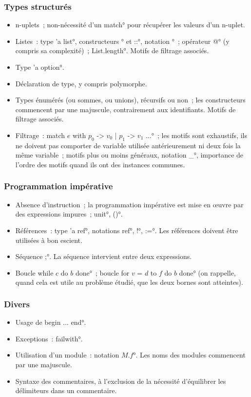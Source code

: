 \subsubsection*{Types structurés}
\begin{itemize}
\item n-uplets~; non-nécessité d'un \°match° pour récupérer les valeurs d'un n-uplet.
\item Listes~: type \°'a list°, constructeurs \°[]° et \°::°, notation \°[$x$; $y$; $z$]°~; opérateur \°@° (y compris sa complexité)~; \°List.length°. Motifs de filtrage associés.

\item Type \°'a option°.
\item Déclaration de type, y compris polymorphe.
\item Types énumérés (ou sommes, ou unions), récursifs ou non~; les constructeurs commencent par une majuscule, contrairement aux identifiants. Motifs de filtrage associés.

\item Filtrage~: \°match $e$ with $p_0$ -> $v_0$ | $p_1$ -> $v_1$ $\dots$°~; les motifs sont exhaustifs, ils ne doivent pas comporter de variable utilisée antérieurement ni deux fois la même variable~; motifs plus ou moins généraux, notation \°_°, importance de l'ordre des motifs quand ils ont des instances communes.

\end{itemize}

\subsubsection*{Programmation impérative}
\begin{itemize}
\item Absence d'instruction~; la programmation impérative est mise en \oe uvre par des expressions impures~; \°unit°, \°()°.
\item Références~: type \°'a ref°, notations \°ref°, \°!°, \°:=°. Les références doivent être utilisées à bon escient.
\item Séquence \°;°. La séquence intervient entre deux expressions.
\item Boucle \°while $c$ do $b$ done°~; boucle \°for $v$ = $d$ to $f$ do $b$ done° (on rappelle, quand cela est utile au problème étudié, que les deux bornes sont atteintes).
\end{itemize}

\subsubsection*{Divers}
\begin{itemize}
\item Usage de \°begin $…$ end°.
\item Exceptions~: \°failwith°.
\item Utilisation d'un module~: notation \°$M$.$f$°. Les noms des modules commencent par une majuscule.
\item Syntaxe des commentaires, à l'exclusion de la nécessité d'équilibrer les délimiteurs dans un commentaire.
\end{itemize}

